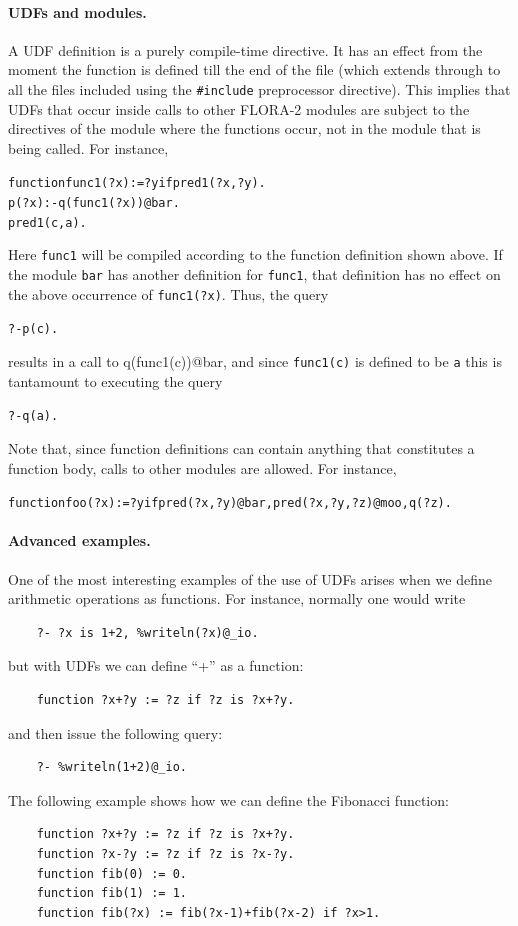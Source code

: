 \documentclass[11pt]{article}
\begin{document}
\paragraph{UDFs and modules.}
A UDF definition is a purely compile-time directive. It has an effect from
the moment the function is defined till the end of the file (which extends
through to
all the files included using the \texttt{\#include} preprocessor
directive). This implies that UDFs that occur inside calls to other FLORA-2
modules are subject to the directives of the module where the functions
occur, not in the module that is being called. For instance, 
\begin{alltt}
    function func1(?x) := ?y if pred1(?x,?y).
    p(?x) :- q(func1(?x))@bar.
    pred1(c,a).
\end{alltt}
Here \texttt{func1} will be compiled according to the function definition
shown above. If the module \texttt{bar} has another definition for
\texttt{func1}, that definition has no effect on the above occurrence of
\texttt{func1(?x)}.   Thus, the query
\begin{alltt}
?- p(c).
\end{alltt}
results in a call to q(func1(c))@bar, and since \texttt{func1(c)} is
defined to be \texttt{a} this is tantamount to executing the query  
\begin{alltt}
?- q(a).
\end{alltt}
Note that, since function definitions can contain anything that constitutes
a function body, calls to other modules are allowed. For instance, 
\begin{alltt}
    function foo(?x):=?y if pred(?x,?y)@bar, pred(?x,?y,?z)@moo, q(?z).
\end{alltt}

\paragraph{Advanced examples.}
One of the most interesting examples of the use of UDFs arises when we
define arithmetic operations as functions. For instance, normally one would
write
\begin{verbatim}
    ?- ?x is 1+2, %writeln(?x)@_io.
\end{verbatim}
but with UDFs we can define ``+'' as a function:
\begin{verbatim}
    function ?x+?y := ?z if ?z is ?x+?y.
\end{verbatim}
and then issue the following query:
\begin{verbatim}
    ?- %writeln(1+2)@_io.
\end{verbatim}
The following example shows how we can define the Fibonacci function:
\begin{verbatim}
    function ?x+?y := ?z if ?z is ?x+?y.
    function ?x-?y := ?z if ?z is ?x-?y.
    function fib(0) := 0.
    function fib(1) := 1.
    function fib(?x) := fib(?x-1)+fib(?x-2) if ?x>1.
\end{verbatim}
\end{document}
